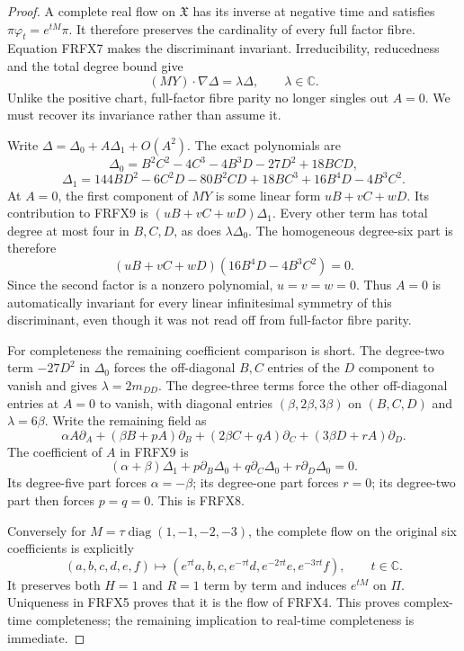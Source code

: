 \documentclass[11pt]{article}
\newcommand{\C}{\mathbb C}
\newcommand{\diag}{\operatorname{diag}}
\begin{document}
\begin{proof}
A complete real flow on $\mathfrak X$ has its inverse at negative time
and satisfies $\pi\varphi_t=e^{tM}\pi$. It therefore preserves the
cardinality of every full factor fibre. Equation FRFX7 makes the
discriminant invariant. Irreducibility, reducedness and the total degree
bound give
\[
 (MY)\cdot\nabla\Delta=\lambda\Delta,\qquad\lambda\in\C.
 \tag{FRFX9}
\]
Unlike the positive chart, full-factor fibre parity no longer singles
out $A=0$. We must recover its invariance rather than assume it.

Write $\Delta=\Delta_0+A\Delta_1+O(A^2)$. The exact polynomials are
\[
 \Delta_0=B^2C^2-4C^3-4B^3D-27D^2+18BCD,
\]
\[
 \Delta_1=144BD^2-6C^2D-80B^2CD+18BC^3+16B^4D-4B^3C^2.
 \tag{FRFX10}
\]
At $A=0$, the first component of $MY$ is some linear form
$uB+vC+wD$. Its contribution to FRFX9 is $(uB+vC+wD)\Delta_1$.
Every other term has total degree at most four in $B,C,D$, as does
$\lambda\Delta_0$. The homogeneous degree-six part is therefore
\[
 (uB+vC+wD)(16B^4D-4B^3C^2)=0.
\]
Since the second factor is a nonzero polynomial, $u=v=w=0$.
Thus $A=0$ is automatically invariant for every linear infinitesimal
symmetry of this discriminant, even though it was not read off from
full-factor fibre parity.

For completeness the remaining coefficient comparison is short.
The degree-two term $-27D^2$ in $\Delta_0$ forces the off-diagonal
$B,C$ entries of the $D$ component to vanish and gives
$\lambda=2m_{DD}$. The degree-three terms force the other off-diagonal
entries at $A=0$ to vanish, with diagonal entries
$(\beta,2\beta,3\beta)$ on $(B,C,D)$ and $\lambda=6\beta$.
Write the remaining field as
\[
 \alpha A\partial_A+(\beta B+pA)\partial_B+
 (2\beta C+qA)\partial_C+(3\beta D+rA)\partial_D.
\]
The coefficient of $A$ in FRFX9 is
\[
 (\alpha+\beta)\Delta_1+p\partial_B\Delta_0+
 q\partial_C\Delta_0+r\partial_D\Delta_0=0.
\]
Its degree-five part forces $\alpha=-\beta$; its degree-one part
forces $r=0$; its degree-two part then forces $p=q=0$. This is FRFX8.

Conversely for $M=\tau\diag(1,-1,-2,-3)$, the complete flow on the
original six coefficients is explicitly
\[
 (a,b,c,d,e,f)\longmapsto
 (e^{\tau t}a,b,c,e^{-\tau t}d,e^{-2\tau t}e,e^{-3\tau t}f),
 \qquad t\in\C.\tag{FRFX11}
\]
It preserves both $H=1$ and $R=1$ term by term and induces $e^{tM}$
on $\Pi$. Uniqueness in FRFX5 proves that it is the flow of FRFX4.
This proves complex-time completeness; the remaining implication to
real-time completeness is immediate.
\end{proof}
\end{document}

